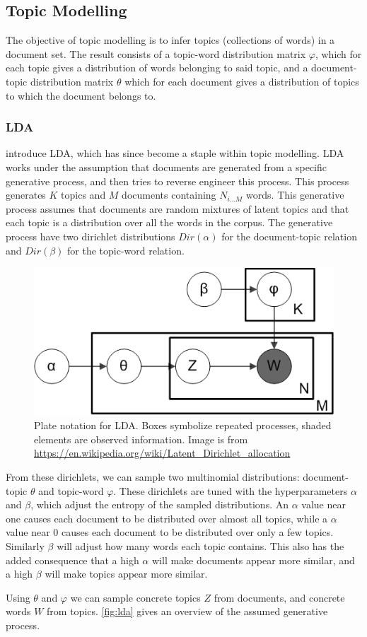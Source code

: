 \subsection{Topic Modelling}\label{subsec:topicModelling}
The objective of topic modelling is to infer topics (collections of words) in a document set.
The result consists of a topic-word distribution matrix $\varphi$, which for each topic gives a distribution of words belonging to said topic, and a document-topic distribution matrix $\theta$ which for each document gives a distribution of topics to which the document belongs to.

\subsubsection{\acrlong{LDA}}\label{subsec:lda}
 introduce \gls{LDA}, which has since become a staple within topic modelling.
\gls{LDA} works under the assumption that documents are generated from a specific generative process, and then tries to reverse engineer this process.
This process generates $K$ topics and $M$ documents containing $N_{i\dots M}$ words.
This generative process assumes that documents are random mixtures of latent topics and that each topic is a distribution over all the words in the corpus.
The generative process have two dirichlet distributions $Dir(\alpha)$ for the document-topic relation and $Dir(\beta)$ for the topic-word relation.

\begin{figure}[h]
	\centering
	\includegraphics[width= 0.3 \textwidth]{figures/Smoothed_LDA.PNG}
	\caption{Plate notation for \gls{LDA}. Boxes symbolize repeated processes, shaded elements are observed information. Image is from \url{https://en.wikipedia.org/wiki/Latent_Dirichlet_allocation}}
	\label{fig:lda}
\end{figure}

From these dirichlets, we can sample two multinomial distributions: document-topic $\theta$ and topic-word $\varphi$.
These dirichlets are tuned with the hyperparameters $\alpha$ and $\beta$, which adjust the entropy of the sampled distributions.
An $\alpha$ value near one causes each document to be distributed over almost all topics, while a $\alpha$ value near 0 causes each document to be distributed over only a few topics.
Similarly $\beta$ will adjust how many words each topic contains.
This also has the added consequence that a high $\alpha$ will make documents appear more similar, and a high $\beta$ will make topics appear more similar.

Using $\theta$ and $\varphi$ we can sample concrete topics $Z$ from documents, and concrete words $W$ from topics.
\autoref{fig:lda} gives an overview of the assumed generative process.
